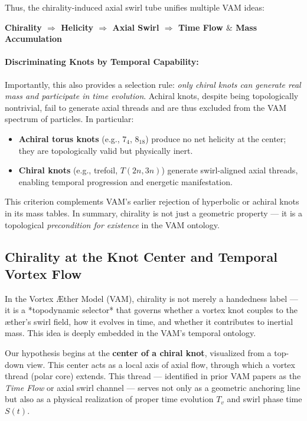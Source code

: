 Thus, the chirality-induced axial swirl tube unifies multiple VAM ideas:
\vspace{0.5em}
\begin{center}
\textbf{Chirality $\Rightarrow$ Helicity $\Rightarrow$ Axial Swirl $\Rightarrow$ Time Flow $\&$ Mass Accumulation}
\end{center}

\paragraph{Discriminating Knots by Temporal Capability:}
Importantly, this also provides a selection rule: \emph{only chiral knots can generate real mass and participate in time evolution}. Achiral knots, despite being topologically nontrivial, fail to generate axial threads and are thus excluded from the VAM spectrum of particles. In particular:
\begin{itemize}
    \item \textbf{Achiral torus knots} (e.g., $7_4$, $8_{18}$) produce no net helicity at the center; they are topologically valid but physically inert.
    \item \textbf{Chiral knots} (e.g., trefoil, $T(2n,3n)$) generate swirl-aligned axial threads, enabling temporal progression and energetic manifestation.
\end{itemize}

This criterion complements VAM’s earlier rejection of hyperbolic or achiral knots in its mass tables. In summary, chirality is not just a geometric property --- it is a topological \textit{precondition for existence} in the VAM ontology.

\subsection{Chirality at the Knot Center and Temporal Vortex Flow}

In the Vortex Æther Model (VAM), chirality is not merely a handedness label — it is a *topodynamic selector* that governs whether a vortex knot couples to the æther's swirl field, how it evolves in time, and whether it contributes to inertial mass. This idea is deeply embedded in the VAM's temporal ontology.

Our hypothesis begins at the \textbf{center of a chiral knot}, visualized from a top-down view. This center acts as a local axis of axial flow, through which a vortex thread (polar core) extends. This thread — identified in prior VAM papers as the \textit{Time Flow} or axial swirl channel — serves not only as a geometric anchoring line but also as a physical realization of proper time evolution $T_v$ and swirl phase time $S(t)$.

